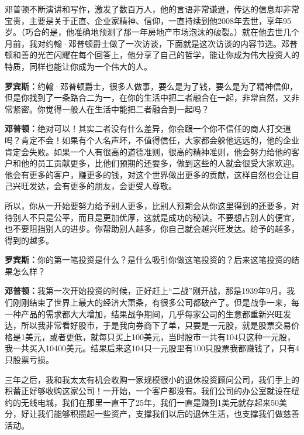 邓普顿不断演讲和写作，激发了数百万人，他的言语非常谦逊，传达的信息却非常宝贵，主要是关于正直、企业家精神、信仰，一直持续到他2008年去世，享年95岁。（巧合的是，他准确地预测了那一年房地产市场泡沫的破裂。）就在他去世几个月前，我对约翰·邓普顿爵士做了一次访谈，下面就是这次访谈的内容节选。邓普顿和善的光芒闪耀在每个回答上，他分享了自己的哲学，能让你成为伟大投资人的特质，同样也能让你成为一个伟大的人。

\begin{BookQuote}
\textbf{罗宾斯：}约翰·邓普顿爵士，很多人做事，要么是为了钱，要么是为了精神信仰，但是你找到了一条路合二为一，在你的生活中把二者融合在一起，非常自然，又非常紧密。你觉得一般人在生活中能把二者融合到一起吗？
\end{BookQuote}

\begin{BookQuote}
\textbf{邓普顿：}绝对可以！其实二者没有什么差异，你会跟一个你不信任的商人打交道吗？肯定不会！如果有个人名声坏，不值得信任，大家都会躲他远远的，他的企业肯定会失败。如果一个人有很高的道德准则，很高的精神准则，他会努力给他的客户和他的员工贡献更多，比他们预期的还要多，做到这些的人就会很受大家欢迎。他会有更多的客户，赚更多的钱，对这个世界做出更多的贡献，这样自然也会让自己兴旺发达，会有更多的朋友，会更受人尊敬。
\end{BookQuote}

所以，你从一开始要努力给予别人更多，比别人预期会从你这里得到的还要多，对待别人不只是公平，而且是更加优厚，这就是成功的秘诀。不要想占别人的便宜，也不要阻挡别人的进步。你帮助别人越多，你自己就会越兴旺发达。给予的越多，得到的越多。

\begin{BookQuote}
\textbf{罗宾斯：}你的第一笔投资是什么？是什么吸引你做这笔投资的？后来这笔投资的结果怎么样？
\end{BookQuote}

\begin{BookQuote}
\textbf{邓普顿：}我第一次开始投资的时候，正好赶上“二战”刚开战，那是1939年9月。我们刚刚结束了世界上最大的经济大萧条，有很多公司都破产了。但是战争一来，每一种产品的需求都大大增加，结果战争期间，几乎每家公司的生意都重新兴旺发达，所以我非常看好股市，于是我向券商下了单，只要是一元股，就是股票交易价格是1美元，或者更低，就每只买上100美元，当时股市一共有104只这种一元股，我一共买入10400美元。结果后来这104只一元股里有100只股票我都赚钱了，只有4只股票亏损。
\end{BookQuote}

三年之后，我和我太太有机会收购一家规模很小的退休投资顾问公司，我们手上的积蓄正好够收购这家公司！一开始，一个客户都没有。我们公司的办公室就设在纽约的无线电城，我们在那里一直干了25年，我们一直是赚到1美元就存起来50美分，好让我们能够积攒起一些资产，支撑我们以后的退休生活，也支撑我们做慈善活动。

